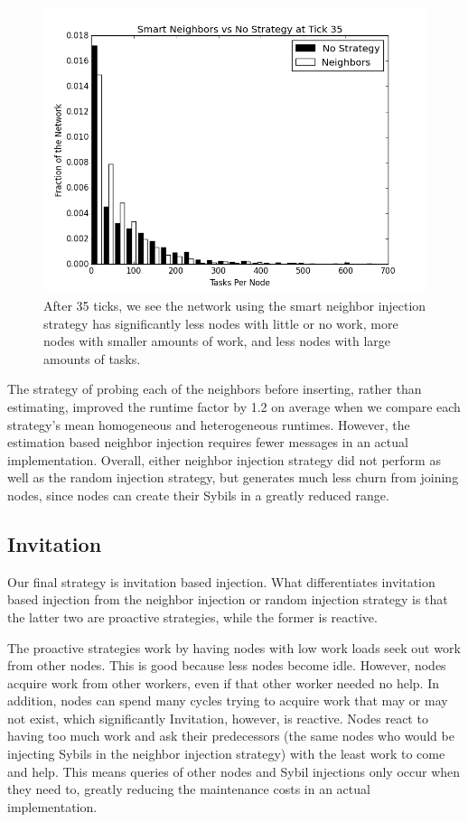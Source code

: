 \documentclass[11pt,conference]{IEEEtran}
\begin{document}
{	
	\begin{figure}
		\centering
		\includegraphics[width=0.7\linewidth]{figs/neighborsStableSmartHist35}
		\caption[Smart Neighbor injection  vs no strategy after 35 ticks.]{After 35 ticks, we see the network using the smart neighbor injection strategy has significantly less nodes with little or no work, more nodes with smaller amounts of work, and less nodes with large amounts of tasks.}
		\label{fig:neighborsStableSmartHist35}
	\end{figure}
	
	
	
	The strategy of probing each of the neighbors before inserting, rather than estimating, improved the runtime factor by 1.2  on average when we compare each strategy's mean homogeneous and heterogeneous runtimes.
	However, the estimation based neighbor injection requires fewer messages in an actual implementation.
	Overall, either neighbor injection strategy did not perform as well as the random injection strategy, but generates much less churn from joining nodes, since nodes can create their Sybils in a greatly reduced range.
	
	\subsection{Invitation}
	Our final strategy is invitation based injection.
	What differentiates invitation based injection from the neighbor injection or random injection strategy is that the latter two are proactive strategies, while the former is reactive.
	
	The proactive strategies work by having nodes with low work loads seek out work from other nodes.
	This is good because less nodes become idle.
	However, nodes acquire work from other workers, even if that other worker needed no help.
	In addition, nodes can spend many cycles trying to acquire work that may or may not exist, which significantly 
	Invitation, however, is reactive.
	Nodes react to having too much work and ask their predecessors (the same nodes who would be injecting Sybils in the neighbor injection strategy) with the least work to come and help.
	This means queries of other nodes and Sybil injections only occur when they need to, greatly reducing the maintenance costs in an actual implementation.
	
}
\end{document}
